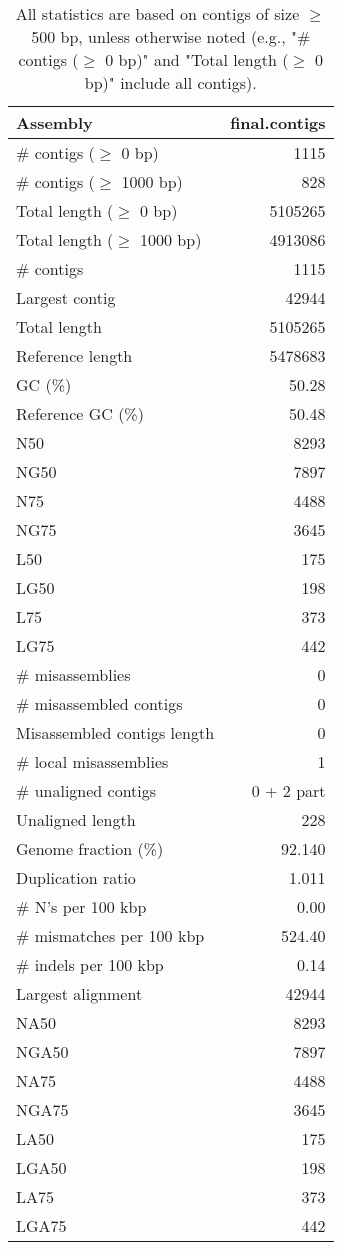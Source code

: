 \documentclass[12pt,a4paper]{article}
\begin{document}
\begin{table}[ht]
\begin{center}
\caption{All statistics are based on contigs of size $\geq$ 500 bp, unless otherwise noted (e.g., "\# contigs ($\geq$ 0 bp)" and "Total length ($\geq$ 0 bp)" include all contigs).}
\begin{tabular}{|l*{1}{|r}|}
\hline
Assembly & final.contigs \\ \hline
\# contigs ($\geq$ 0 bp) & 1115 \\ \hline
\# contigs ($\geq$ 1000 bp) & 828 \\ \hline
Total length ($\geq$ 0 bp) & 5105265 \\ \hline
Total length ($\geq$ 1000 bp) & 4913086 \\ \hline
\# contigs & 1115 \\ \hline
Largest contig & 42944 \\ \hline
Total length & 5105265 \\ \hline
Reference length & 5478683 \\ \hline
GC (\%) & 50.28 \\ \hline
Reference GC (\%) & 50.48 \\ \hline
N50 & 8293 \\ \hline
NG50 & 7897 \\ \hline
N75 & 4488 \\ \hline
NG75 & 3645 \\ \hline
L50 & 175 \\ \hline
LG50 & 198 \\ \hline
L75 & 373 \\ \hline
LG75 & 442 \\ \hline
\# misassemblies & 0 \\ \hline
\# misassembled contigs & 0 \\ \hline
Misassembled contigs length & 0 \\ \hline
\# local misassemblies & 1 \\ \hline
\# unaligned contigs & 0 + 2 part \\ \hline
Unaligned length & 228 \\ \hline
Genome fraction (\%) & 92.140 \\ \hline
Duplication ratio & 1.011 \\ \hline
\# N's per 100 kbp & 0.00 \\ \hline
\# mismatches per 100 kbp & 524.40 \\ \hline
\# indels per 100 kbp & 0.14 \\ \hline
Largest alignment & 42944 \\ \hline
NA50 & 8293 \\ \hline
NGA50 & 7897 \\ \hline
NA75 & 4488 \\ \hline
NGA75 & 3645 \\ \hline
LA50 & 175 \\ \hline
LGA50 & 198 \\ \hline
LA75 & 373 \\ \hline
LGA75 & 442 \\ \hline
\end{tabular}
\end{center}
\end{table}
\end{document}
